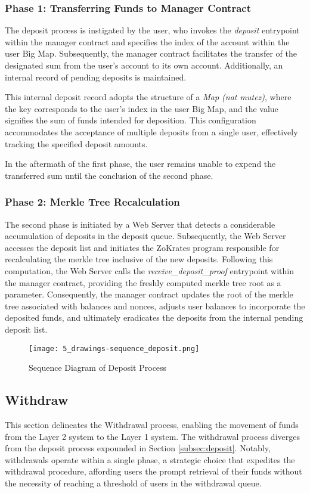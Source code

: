 \subsubsection{Phase 1: Transferring Funds to Manager Contract}
The deposit process is instigated by the user, who invokes the \textit{deposit} entrypoint within the manager contract and specifies the index of the account within the user Big Map. Subsequently, the manager contract facilitates the transfer of the designated sum from the user's account to its own account. Additionally, an internal record of pending deposits is maintained.

This internal deposit record adopts the structure of a \textit{Map (nat mutez)}, where the key corresponds to the user's index in the user Big Map, and the value signifies the sum of funds intended for deposition. This configuration accommodates the acceptance of multiple deposits from a single user, effectively tracking the specified deposit amounts.

In the aftermath of the first phase, the user remains unable to expend the transferred sum until the conclusion of the second phase.

\subsubsection{Phase 2: Merkle Tree Recalculation}
The second phase is initiated by a Web Server that detects a considerable accumulation of deposits in the deposit queue. Subsequently, the Web Server accesses the deposit list and initiates the ZoKrates program responsible for recalculating the merkle tree inclusive of the new deposits. Following this computation, the Web Server calls the \textit{receive\_deposit\_proof} entrypoint within the manager contract, providing the freshly computed merkle tree root as a parameter. Consequently, the manager contract updates the root of the merkle tree associated with balances and nonces, adjusts user balances to incorporate the deposited funds, and ultimately eradicates the deposits from the internal pending deposit list.

\begin{figure}[ht]
	\centering
	\texttt{[image: 5\_drawings-sequence\_deposit.png]}
	\caption[Scaling Solutions]{Sequence Diagram of Deposit Process}  
	\label{fig:5_drawings-sequence_deposit.png}
  \end{figure} 

  \subsection{Withdraw}
  This section delineates the Withdrawal process, enabling the movement of funds from the Layer 2 system to the Layer 1 system. The withdrawal process diverges from the deposit process expounded in Section \ref{subsec:deposit}. Notably, withdrawals operate within a single phase, a strategic choice that expedites the withdrawal procedure, affording users the prompt retrieval of their funds without the necessity of reaching a threshold of users in the withdrawal queue.
  
